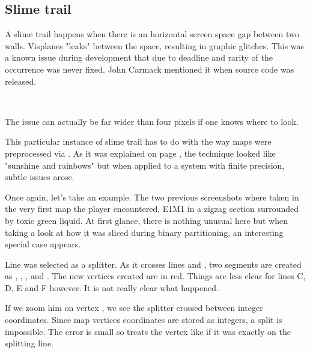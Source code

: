 \subsection{Slime trail}
A slime trail happens when there is an horizontal screen space gap between two walls. Visplanes "leaks" between the space, resulting in graphic glitches. This was a known issue during development that due to deadline and rarity of the occurrence was never fixed. John Carmack mentioned it when  source code was released.\\
\par
{}\\
\par



The issue can actually be far wider than four pixels if one knows where to look.\\
\par
{}
\par
This particular instance of slime trail has to do with the way maps were preprocessed via . As it was explained on page \pageref{Binary Space Partitioning: Theory}, the technique looked like "sunshine and rainbows" but when applied to a system with finite precision, subtle issues arose.\\
\par
 Once again, let's take an example. The two previous screenshots where taken in the very first map the player encountered, E1M1 in a zigzag section surrounded by toxic green liquid. At first glance, there is nothing unusual here but when taking a look at how it was sliced during binary partitioning, an interesting special case appears.\\
\par
Line  was selected as a splitter. As it crosses lines  and , two segments are created as , , , and . The new vertices created are in red. Things are less clear for lines C, D, E and F however. It is not really clear what happened. \\
\par
If we zoom him on vertex , we see the splitter crossed  between integer coordinates. Since map vertices coordinates are stored as integers, a split is impossible. The error is small so  treats the vertex like if it was exactly on the splitting line.

